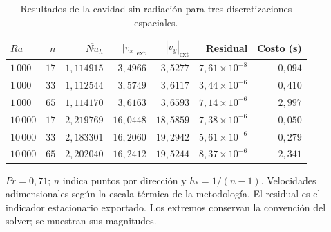 \begin{table}[htbp]
\centering
\caption{Resultados de la cavidad sin radiación para tres discretizaciones espaciales.}
\label{tab:res_cavidad_espacial}
\small
\setlength{\tabcolsep}{5pt}
\begin{tabular}{lrrrrrr}
\toprule
$Ra$ & $n$ & $\overline{Nu}_h$ & $|v_x|_{\mathrm{ext}}$ & $|v_y|_{\mathrm{ext}}$ & Residual & Costo (s) \\
\midrule
$1\,000$ & $17$ & $1{,}114915$ & $3{,}4966$ & $3{,}5277$ & $7{,}61\times10^{-8}$ & $0{,}094$ \\
$1\,000$ & $33$ & $1{,}112544$ & $3{,}5749$ & $3{,}6117$ & $3{,}44\times10^{-6}$ & $0{,}410$ \\
$1\,000$ & $65$ & $1{,}114170$ & $3{,}6163$ & $3{,}6593$ & $7{,}14\times10^{-6}$ & $2{,}997$ \\
$10\,000$ & $17$ & $2{,}219769$ & $16{,}0448$ & $18{,}5859$ & $7{,}38\times10^{-6}$ & $0{,}050$ \\
$10\,000$ & $33$ & $2{,}183301$ & $16{,}2060$ & $19{,}2942$ & $5{,}61\times10^{-6}$ & $0{,}279$ \\
$10\,000$ & $65$ & $2{,}202040$ & $16{,}2412$ & $19{,}5244$ & $8{,}37\times10^{-6}$ & $2{,}341$ \\
\bottomrule
\end{tabular}
\par\vspace{3pt}
\begin{minipage}{0.98\textwidth}\footnotesize
$Pr=0{,}71$; $n$ indica puntos por dirección y $h_*=1/(n-1)$. Velocidades adimensionales según la escala térmica de la metodología. El residual es el indicador estacionario exportado. Los extremos conservan la convención del solver; se muestran sus magnitudes.
\end{minipage}
\end{table}
